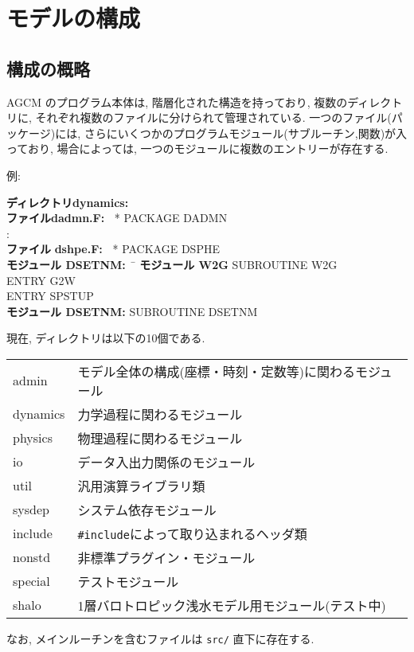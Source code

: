 ﻿%

\section{モデルの構成}

\subsection{構成の概略}

AGCM のプログラム本体は, 階層化された構造を持っており,
複数のディレクトリに, それぞれ複数のファイルに分けられて管理されている.
一つのファイル(パッケージ)には, 
さらにいくつかのプログラムモジュール(サブルーチン,関数)が入っており,
場合によっては, 一つのモジュールに複数のエントリーが存在する.

例: 
\begin{tabbing}
{\bf ディレクトリ}\= {\bf dynamics:\ } \\
 \> {\bf ファイル}\= {\bf dadmn.F:\ } 
                       * PACKAGE DADMN \\
 \>               \> : \\          
 \> {\bf ファイル} \= {\bf dshpe.F:\ } 
                       * PACKAGE DSPHE \\
 \>\> {\bf モジュール DSETNM:\ } \=  \kill
 \>\> {\bf モジュール W2G} 
                      \> SUBROUTINE W2G \\
 \>\>                 \> ENTRY      G2W \\
 \>\>                 \> ENTRY      SPSTUP \\
 \>\> {\bf モジュール DSETNM:} \>  SUBROUTINE DSETNM  \\
\end{tabbing}

\・現在, ディレクトリは以下の10個である. 
\begin{center}
\begin{tabular}{ll}
admin      &       モデル全体の構成(座標・時刻・定数等)に関わるモジュール \\
dynamics   &       力学過程に関わるモジュール\\
physics    &       物理過程に関わるモジュール\\
io         &       データ入出力関係のモジュール \\
util       &       汎用演算ライブラリ類 \\
sysdep     &       システム依存モジュール \\
include    &       {\tt \#include}によって取り込まれるヘッダ類 \\
nonstd     &       非標準プラグイン・モジュール \\
special    &       テストモジュール \\
shalo      &       1層バロトロピック浅水モデル用モジュール(テスト中) \\
\end{tabular}
\end{center}
なお, メインルーチンを含むファイルは {\tt src/} 直下に存在する.


